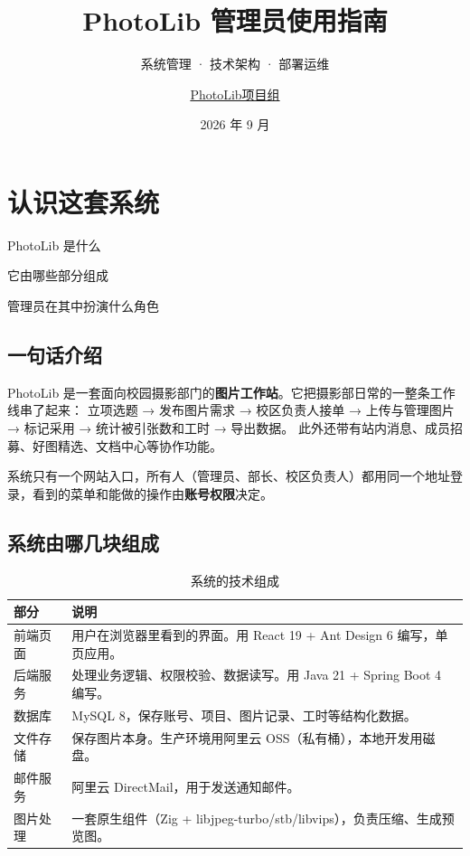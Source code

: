 \documentclass[cn,11pt,green]{elegantbook}
\title{PhotoLib 管理员使用指南}
\subtitle{系统管理 · 技术架构 · 部署运维}
\author{\href{mailto:i@liujr.uk}{PhotoLib项目组}}
\institute{校园摄影部图片工作站}
\date{2026 年 9 月}
\begin{document}
\maketitle
\frontmatter
\tableofcontents
\mainmatter

\chapter{认识这套系统}

\begin{introduction}
  \item PhotoLib 是什么
  \item 它由哪些部分组成
  \item 管理员在其中扮演什么角色
\end{introduction}

\section{一句话介绍}

PhotoLib 是一套面向校园摄影部门的\textbf{图片工作站}。它把摄影部日常的一整条工作线串了起来：
立项选题 → 发布图片需求 → 校区负责人接单 → 上传与管理图片 → 标记采用 → 统计被引张数和工时 → 导出数据。
此外还带有站内消息、成员招募、好图精选、文档中心等协作功能。

系统只有一个网站入口，所有人（管理员、部长、校区负责人）都用同一个地址登录，看到的菜单和能做的操作由\textbf{账号权限}决定。

\section{系统由哪几块组成}

\begin{table}[htbp]
  \centering
  \caption{系统的技术组成}
  \begin{tabular}{L{2.6cm} L{9.5cm}}
    \toprule
    \textbf{部分} & \textbf{说明} \\
    \midrule
    前端页面 & 用户在浏览器里看到的界面。用 React 19 + Ant Design 6 编写，单页应用。 \\
    后端服务 & 处理业务逻辑、权限校验、数据读写。用 Java 21 + Spring Boot 4 编写。 \\
    数据库 & MySQL 8，保存账号、项目、图片记录、工时等结构化数据。 \\
    文件存储 & 保存图片本身。生产环境用阿里云 OSS（私有桶），本地开发用磁盘。 \\
    邮件服务 & 阿里云 DirectMail，用于发送通知邮件。 \\
    图片处理 & 一套原生组件（Zig + libjpeg-turbo/stb/libvips），负责压缩、生成预览图。 \\
    \bottomrule
  \end{tabular}
\end{table}
\end{document}
